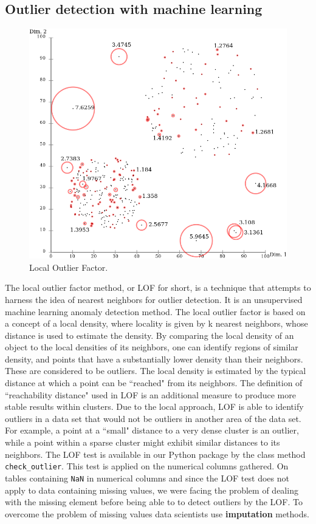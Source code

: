 \documentclass{article}
\begin{document}
\subsection{Outlier detection with machine learning} %
\label{sub:Outlier detection with machine learning}
\begin{figure}[H]
    \centering
    \includegraphics[width=0.6\linewidth]{picture/lof.png}
    \caption{Local Outlier Factor.}
    \label{fig:lof}
\end{figure}
The local outlier factor method, or LOF for short, is a technique that attempts to harness the idea of nearest neighbors for outlier detection.
It is an unsupervised machine learning anomaly detection method.
The local outlier factor is based on a concept of a local density, where locality is given by k nearest neighbors, whose distance is used to estimate the density.
By comparing the local density of an object to the local densities of its neighbors, one can identify regions of similar density, and points that have a substantially lower density than their neighbors. These are considered to be outliers.
The local density is estimated by the typical distance at which a point can be ``reached" from its neighbors.
The definition of ``reachability distance" used in LOF is an additional measure to produce more stable results within clusters.
Due to the local approach, LOF is able to identify outliers in a data set that would not be outliers in another area of the data set.
For example, a point at a ``small" distance to a very dense cluster is an outlier, while a point within a sparse cluster might exhibit similar distances to its neighbors.
The LOF test is available in our Python package by the class method \texttt{check\_outlier}.
This test is applied on the numerical columns gathered.
On tables containing \texttt{NaN} in numerical columns and since the LOF test does not apply to data containing missing values, we were facing the problem of dealing with the missing element before being able to to detect outliers by the LOF.
To overcome the problem of missing values data scientists use \textbf{imputation} methods.\\
\end{document}
